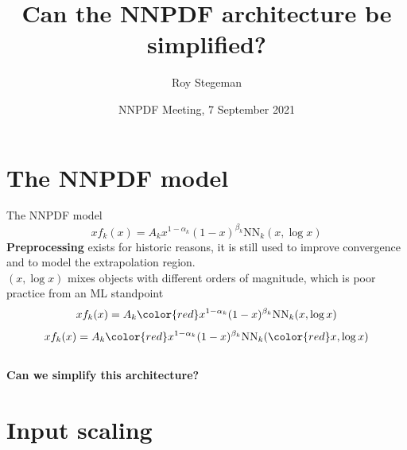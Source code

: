 \documentclass[aspectratio=169,11pt]{beamer}
\title{Can the NNPDF architecture be simplified?}
\date{NNPDF Meeting, 7 September 2021}
\author{Roy Stegeman}
\institute{University of Milan and INFN Milan}
\newcommand{\nn}{\vspace*{1em}}
\begin{document}
{
\begin{frame}
  \titlepage
\end{frame}
}


\section*{The NNPDF model}



\begin{frame}[t]{The NNPDF model}
   {$$ xf_k(x) = A_k x^{1-\alpha_k}(1-x)^{\beta_k} \mathrm{NN}_k(x,\log x) $$}
   {{\bf Preprocessing} exists for historic reasons, it is still used to improve convergence and to model the extrapolation region. \\ \nn}
   {$(x,\log x)$ mixes objects with different orders of magnitude, which is poor practice from an ML standpoint \\ \nn}
   {$$ xf_k(x) = A_k {\color{red} x^{1-\alpha_k}(1-x)^{\beta_k}} \mathrm{NN}_k(x,\log x) $$}
   {$$ xf_k(x) = A_k {\color{red} x^{1-\alpha_k}(1-x)^{\beta_k}} \mathrm{NN}_k({\color{red} x,\log x}) $$}
   {\\ \vspace*{1.5cm} \bf \centering Can we simplify this architecture?}
\end{frame}


\section{Input scaling}
\end{document}
